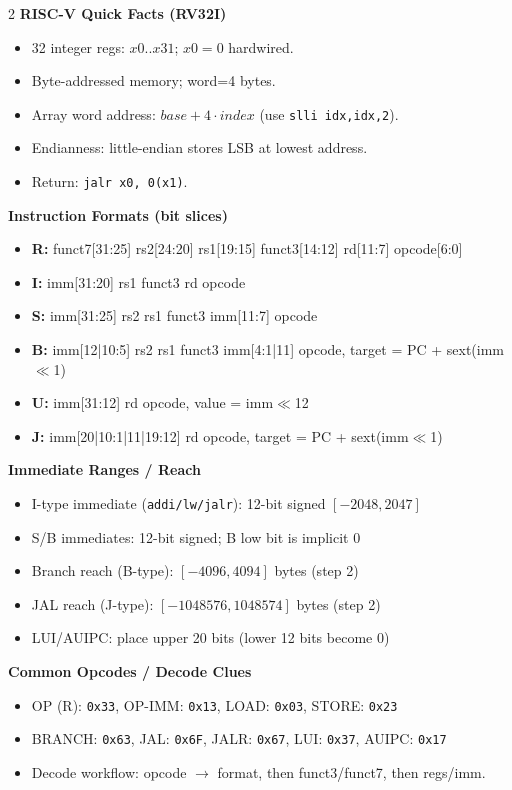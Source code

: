 \documentclass[10pt]{article}
\newcommand{\hdr}[1]{\vspace{2pt}\textbf{#1}\vspace{1pt}\\}
\begin{document}
\begin{multicols}{2}
\hdr{RISC-V Quick Facts (RV32I)}
\begin{itemize}
\item 32 integer regs: $x0..x31$; $x0=0$ hardwired.
\item Byte-addressed memory; word=4 bytes.
\item Array word address: $base + 4\cdot index$ (use \texttt{slli idx,idx,2}).
\item Endianness: little-endian stores LSB at lowest address.
\item Return: \texttt{jalr x0, 0(x1)}.
\end{itemize}

\hdr{Instruction Formats (bit slices)}
\begin{itemize}
\item \textbf{R:} funct7[31:25] rs2[24:20] rs1[19:15] funct3[14:12] rd[11:7] opcode[6:0]
\item \textbf{I:} imm[31:20] rs1 funct3 rd opcode
\item \textbf{S:} imm[31:25] rs2 rs1 funct3 imm[11:7] opcode
\item \textbf{B:} imm[12|10:5] rs2 rs1 funct3 imm[4:1|11] opcode, target = PC + sext(imm$\ll$1)
\item \textbf{U:} imm[31:12] rd opcode, value = imm$\ll$12
\item \textbf{J:} imm[20|10:1|11|19:12] rd opcode, target = PC + sext(imm$\ll$1)
\end{itemize}

\hdr{Immediate Ranges / Reach}
\begin{itemize}
\item I-type immediate (\texttt{addi/lw/jalr}): 12-bit signed $[-2048, 2047]$
\item S/B immediates: 12-bit signed; B low bit is implicit 0
\item Branch reach (B-type): $[-4096,4094]$ bytes (step 2)
\item JAL reach (J-type): $[-1048576,1048574]$ bytes (step 2)
\item LUI/AUIPC: place upper 20 bits (lower 12 bits become 0)
\end{itemize}

\hdr{Common Opcodes / Decode Clues}
\begin{itemize}
\item OP (R): \texttt{0x33}, OP-IMM: \texttt{0x13}, LOAD: \texttt{0x03}, STORE: \texttt{0x23}
\item BRANCH: \texttt{0x63}, JAL: \texttt{0x6F}, JALR: \texttt{0x67}, LUI: \texttt{0x37}, AUIPC: \texttt{0x17}
\item Decode workflow: opcode $\to$ format, then funct3/funct7, then regs/imm.
\end{itemize}


\end{multicols}
\end{document}
